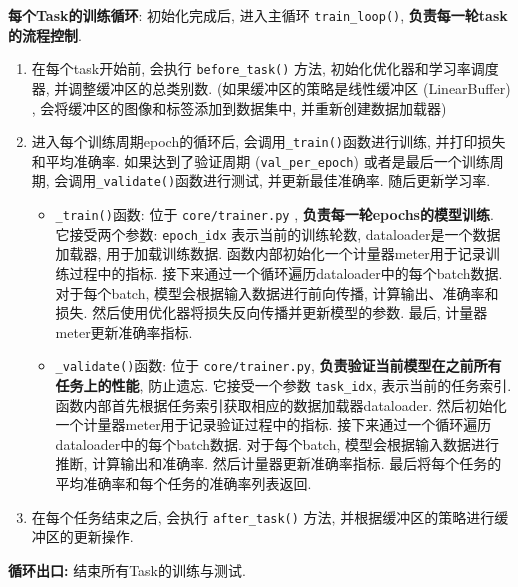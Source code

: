 \textbf{每个Task的训练循环}: 初始化完成后, 进入主循环 \lstinline{train_loop()}, \textbf{负责每一轮task的流程控制}. 
\begin{enumerate}
    \item 在每个task开始前, 会执行 \lstinline{before_task()} 方法, 初始化优化器和学习率调度器, 并调整缓冲区的总类别数.  (如果缓冲区的策略是线性缓冲区 (LinearBuffer) , 会将缓冲区的图像和标签添加到数据集中, 并重新创建数据加载器) 
    \item 进入每个训练周期epoch的循环后, 会调用\lstinline{_train()}函数进行训练, 并打印损失和平均准确率. 如果达到了验证周期 (\lstinline{val_per_epoch}) 或者是最后一个训练周期, 会调用\lstinline{_validate()}函数进行测试, 并更新最佳准确率. 随后更新学习率. 
    \begin{itemize}
    \item \lstinline{_train()}函数: 位于 \lstinline{core/trainer.py} , \textbf{负责每一轮epochs的模型训练}. 它接受两个参数: \lstinline{epoch_idx} 表示当前的训练轮数, dataloader是一个数据加载器, 用于加载训练数据. 
    函数内部初始化一个计量器meter用于记录训练过程中的指标. 接下来通过一个循环遍历dataloader中的每个batch数据. 对于每个batch, 模型会根据输入数据进行前向传播, 计算输出、准确率和损失. 然后使用优化器将损失反向传播并更新模型的参数. 最后, 计量器meter更新准确率指标. 
    \item \lstinline{_validate()}函数: 位于 \lstinline{core/trainer.py}, \textbf{负责验证当前模型在之前所有任务上的性能}, 防止遗忘. 它接受一个参数 \lstinline{task_idx}, 表示当前的任务索引. 
    函数内部首先根据任务索引获取相应的数据加载器dataloader. 然后初始化一个计量器meter用于记录验证过程中的指标. 接下来通过一个循环遍历dataloader中的每个batch数据. 对于每个batch, 模型会根据输入数据进行推断, 计算输出和准确率. 然后计量器更新准确率指标. 最后将每个任务的平均准确率和每个任务的准确率列表返回. 
\end{itemize}
    \item 在每个任务结束之后, 会执行 \lstinline{after_task()} 方法, 并根据缓冲区的策略进行缓冲区的更新操作. 
\end{enumerate}

\textbf{循环出口: }结束所有Task的训练与测试. 

